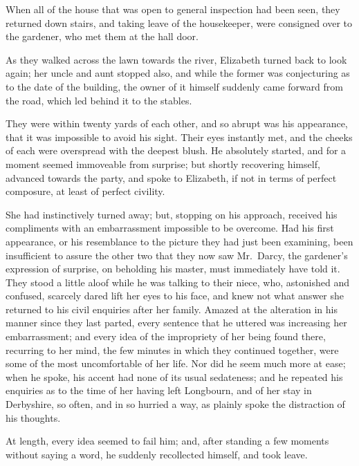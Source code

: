 When all of the house that was open to general inspection
had been seen, they returned down stairs, and taking
leave of the housekeeper, were consigned over to the
gardener, who met them at the hall door.

As they walked across the lawn towards the river,
Elizabeth turned back to look again; her uncle and aunt
stopped also, and while the former was conjecturing as
to the date of the building, the owner of it himself suddenly
came forward from the road, which led behind it to the
stables.

They were within twenty yards of each other, and so
abrupt was his appearance, that it was impossible to avoid
his sight. Their eyes instantly met, and the cheeks of
each were overspread with the deepest blush. He absolutely
started, and for a moment seemed immoveable from
surprise; but shortly recovering himself, advanced towards
the party, and spoke to Elizabeth, if not in terms of perfect
composure, at least of perfect civility.

She had instinctively turned away; but, stopping on
his approach, received his compliments with an embarrassment
impossible to be overcome. Had his first
appearance, or his resemblance to the picture they had
just been examining, been insufficient to assure the other
two that they now saw Mr.\ Darcy, the gardener’s expression
of surprise, on beholding his master, must immediately
have told it. They stood a little aloof while he was talking
to their niece, who, astonished and confused, scarcely
dared lift her eyes to his face, and knew not what answer
she returned to his civil enquiries after her family. Amazed
at the alteration in his manner since they last parted,
every sentence that he uttered was increasing her embarrassment;
and every idea of the impropriety of her being
found there, recurring to her mind, the few minutes in
which they continued together, were some of the most
uncomfortable of her life. Nor did he seem much more
at ease; when he spoke, his accent had none of its usual
sedateness; and he repeated his enquiries as to the time
of her having left Longbourn, and of her stay in Derbyshire,
so often, and in so hurried a way, as plainly spoke
the distraction of his thoughts.

At length, every idea seemed to fail him; and, after
standing a few moments without saying a word, he suddenly
recollected himself, and took leave.

